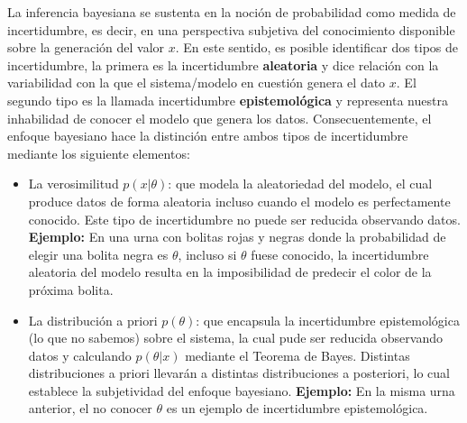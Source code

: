 La inferencia bayesiana se sustenta en la noción de probabilidad como  medida de incertidumbre, es decir, en una perspectiva subjetiva del conocimiento disponible sobre la generación del valor $x$. En este sentido, es posible identificar dos tipos de incertidumbre, la primera es la incertidumbre \textbf{aleatoria} y dice relación con la variabilidad con la que el sistema/modelo en cuestión genera el dato $x$. El segundo tipo es la llamada incertidumbre \textbf{epistemológica} y representa nuestra inhabilidad de conocer el modelo que genera los datos. Consecuentemente, el enfoque bayesiano hace la distinción entre ambos tipos de incertidumbre mediante los siguiente elementos:
\begin{itemize}
	\item La verosimilitud $p(x|\theta)$: que modela la aleatoriedad del modelo, el cual produce datos de forma aleatoria incluso cuando el modelo es perfectamente conocido. Este tipo de incertidumbre no puede ser reducida observando datos. \textbf{Ejemplo:} En una urna con bolitas rojas y negras donde la probabilidad de elegir una bolita negra es $\theta$, incluso si $\theta$ fuese conocido, la incertidumbre aleatoria del modelo resulta en la imposibilidad de predecir el color de la próxima bolita.   
	\item La distribución a priori $p(\theta)$: que encapsula la incertidumbre epistemológica (lo que no sabemos) sobre el sistema, la cual pude ser reducida observando datos y calculando $p(\theta|x)$ mediante el Teorema de Bayes. Distintas distribuciones a priori llevarán a distintas distribuciones a posteriori, lo cual establece la subjetividad del enfoque bayesiano.  \textbf{Ejemplo:} En la misma urna anterior, el no conocer $\theta$ es un ejemplo de incertidumbre epistemológica.
\end{itemize}

